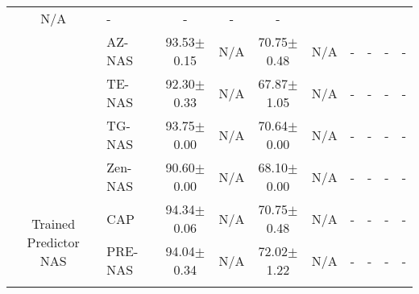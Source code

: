 \begin{table*}[t!]
\begin{center}
{\begin{tabular}{clcccccccc}
                        N/A &
                        - &
                        - &
                        - &
                        - \\
                        &
                        AZ-NAS~\citep{lee2024az} &
                        93.53\tiny$\pm$0.15 &
                        N/A &
                        70.75\tiny$\pm$0.48 &
                        N/A &
                        - &
                        - &
                        - &
                        - \\
                        &
                        TE-NAS~\citep{chen2021neural} &
                        92.30\tiny$\pm$0.33 &
                        N/A &
                        67.87\tiny$\pm$1.05 &
                        N/A &
                        - &
                        - &
                        - &
                        - \\
                        &
                        TG-NAS~\citep{qiao2024tg} &
                        93.75\tiny$\pm$0.00 &
                        N/A &
                        70.64\tiny$\pm$0.00 &
                        N/A &
                        - &
                        - &
                        - &
                        - \\
                        & 
                        Zen-NAS~\citep{lin2021zen} &
                        90.60\tiny$\pm$0.00 &
                        N/A &
                        68.10\tiny$\pm$0.00 &
                        N/A &
                        - &
                        - &
                        - &
                        - \\
                        \midrule
                        \multicolumn{1}{c}{\multirow{5}{*}{Trained Predictor NAS}} &
                        CAP~\citep{ji2024cap} &
                          94.34\tiny$\pm$0.06 &
                          N/A &
                          70.75\tiny$\pm$0.48 &
                          N/A &
                          - &
                          - &
                          - &
                          - \\
                          & 
            
                        PRE-NAS~\citep{ji2024cap} &
                        94.04\tiny$\pm$0.34 &
                        N/A &
                        72.02\tiny$\pm$1.22 &
                        N/A &
                        - &
                        - &
                        - &
                        - \\
                        & 
            

\end{tabular}}
\end{center}
\end{table*}
